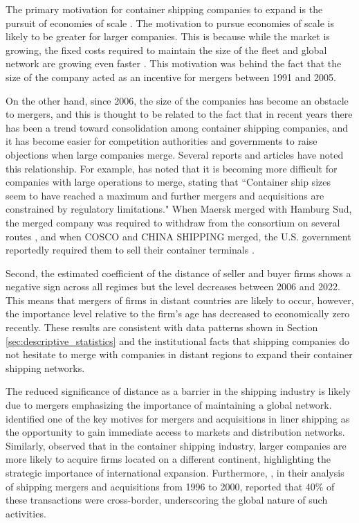\documentclass[10pt]{article}
\begin{document}
The primary motivation for container shipping companies to expand is the pursuit of economies of scale \citep{ITF2019}. The motivation to pursue economies of scale is likely to be greater for larger companies. This is because while the market is growing, the fixed costs required to maintain the size of the fleet and global network are growing even faster \citep{RMT2022}. This motivation was behind the fact that the size of the company acted as an incentive for mergers between 1991 and 2005.

On the other hand, since 2006, the size of the companies has become an obstacle to mergers, and this is thought to be related to the fact that in recent years there has been a trend toward consolidation among container shipping companies, and it has become easier for competition authorities and governments to raise objections when large companies merge. Several reports and articles have noted this relationship. For example, \cite{RMT2022} has noted that it is becoming more difficult for companies with large operations to merge, stating that ``Container ship sizes seem to have reached a maximum and further mergers and acquisitions are constrained by regulatory limitations." When Maersk merged with Hamburg Sud, the merged company was required to withdraw from the consortium on several routes \citep{EU2017}, and when COSCO and CHINA SHIPPING merged, the U.S. government reportedly required them to sell their container terminals \citep{WSJ2019}.


Second, the estimated coefficient of the distance of seller and buyer firms shows a negative sign across all regimes but the level decreases between 2006 and 2022. 
This means that mergers of firms in distant countries are likely to occur, however, the importance level relative to the firm's age has decreased to economically zero recently.
These results are consistent with data patterns shown in Section \ref{sec:descriptive_statistics} and the institutional facts that shipping companies do not hesitate to merge with companies in distant regions to expand their container shipping networks.

The reduced significance of distance as a barrier in the shipping industry is likely due to mergers emphasizing the importance of maintaining a global network. \cite{notteboom2012container} identified one of the key motives for mergers and acquisitions in liner shipping as the opportunity to gain immediate access to markets and distribution networks. Similarly, \cite{yeo2013geography} observed that in the container shipping industry, larger companies are more likely to acquire firms located on a different continent, highlighting the strategic importance of international expansion. Furthermore, \cite{brooks2006mergers}, in their analysis of shipping mergers and acquisitions from 1996 to 2000, reported that 40\% of these transactions were cross-border, underscoring the global nature of such activities.
\end{document}
